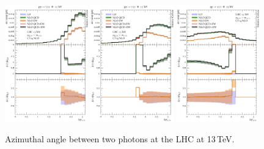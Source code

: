 \begin{figure}[t!]
  \centering
  \includegraphics[width=0.32\textwidth]{figs_aaa/dphi_y1y2}
  \includegraphics[width=0.32\textwidth]{figs_aaa/dphi_y1y3}
  \includegraphics[width=0.32\textwidth]{figs_aaa/dphi_y2y3}
  \caption{
Azimuthal angle between two photons at the LHC at 13\,TeV.\\
    \label{fig:aaa:dphi}
  }
\end{figure}


